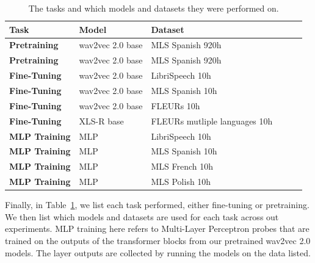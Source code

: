 \begin{table}[h]
\centering
\begin{tabular}{l|lllll}
\hline
\textbf{Task}        &  \textbf{Model} &   \textbf{Dataset}                     \\ \hline
\textbf{Pretraining} & wav2vec 2.0 base & MLS Spanish 920h         \\
\textbf{Pretraining} & wav2vec 2.0 base & MLS Spanish 920h         \\
\textbf{Fine-Tuning} & wav2vec 2.0 base & LibriSpeech 10h \\
\textbf{Fine-Tuning} & wav2vec 2.0 base & MLS Spanish 10h  \\
\textbf{Fine-Tuning} & wav2vec 2.0 base & FLEURs 10h  \\
\textbf{Fine-Tuning} & XLS-R base       & FLEURs mutliple languages 10h   \\ 
\textbf{MLP Training} & MLP & LibriSpeech 10h  \\
\textbf{MLP Training} & MLP & MLS Spanish 10h  \\ 
\textbf{MLP Training} & MLP & MLS French 10h  \\
\textbf{MLP Training} & MLP & MLS Polish 10h  \\ \hline
\end{tabular}
\caption{The tasks and which models and datasets they were performed on.}
\label{lr_tab:models_datasets_training}
\end{table}

Finally, in Table~\ref{lr_tab:models_datasets_training}, we list each task performed, either fine-tuning or pretraining. We then list which models and datasets are used for each task across out experiments. MLP training here refers to Multi-Layer Perceptron probes that are trained on the outputs of the transformer blocks from our pretrained wav2vec 2.0 models. The layer outputs are collected by running the models on the data listed.


\iffalse
